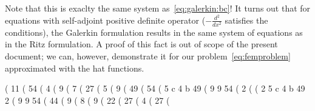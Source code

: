 \documentclass[notitlepage,oneside]{book}
\begin{document}
Note that this is exaclty the same system as~\eqref{eq:galerkin:bc}!
It turns out that for equations with self-adjoint positive definite operator ($-\frac{d^2}{dx^2}$ satisfies the conditions),
the Galerkin formulation results in the same system of equations as in the Ritz formulation.
A proof of this fact is out of scope of the present document; we can, however, demonstrate it for our problem~\eqref{eq:femproblem} approximated with the hat functions.

\iffalse
(%
                                      11
(%
                                      54
(%
                                       4
(%
                                       9
(%
                                      7
(%
                                      27
(%
                                       5
(%
                                       9
(%
                                      49
(%
                                      54
(%
                                5 c   4 b   49
(%
                                 9     9    54
(%
                                         2
(%
(%
                    2                     5 c   4 b   49       2
(%
                                           9     9    54
(%
                                               44
(%
                                               9
(%
                                             8
(%
                                             9
(%
                                      22
(%
                                      27
(%
                                      4
(%
                                      27
(%
\end{document}
